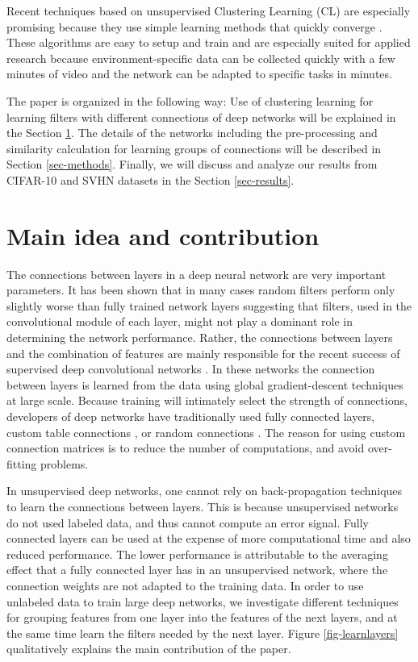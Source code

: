 \documentclass{article} %
\begin{document}
Recent techniques based on unsupervised Clustering Learning (CL) are especially promising because they use 
simple learning methods that quickly converge \cite{culurciello2013clustering,coates_analysis_2011}.
These algorithms are easy to setup and train and are especially suited for applied research because environment-specific data 
can be collected quickly with a few minutes of video and the network can be adapted to specific tasks in minutes.

The paper is organized in the following way: 
Use of clustering learning for learning filters with different connections of deep networks will be explained in the Section \ref{sec-main}. 
The details of the networks including the pre-processing and similarity calculation for learning groups of connections will be described in Section \ref{sec-methods}. 
Finally, we will discuss and analyze our results from CIFAR-10 and SVHN datasets in the Section \ref{sec-results}. 


\section{Main idea and contribution}
\label{sec-main}

The connections between layers in a deep neural network are very important parameters.
It has been shown that in many cases random filters perform only slightly worse than fully trained network layers \cite{saxe2011random} suggesting
that filters, used in the convolutional module of each layer, might not play a dominant role in determining the network performance.
Rather, the connections between layers and the combination of features are mainly responsible for the recent success of 
supervised deep convolutional networks \cite{krizhevsky_imagenet_2012}.
In these networks the connection between layers is
learned from the data using global gradient-descent techniques at large scale.
Because training will intimately select the strength of connections, 
developers of deep networks have traditionally used fully connected layers, custom table connections \cite{lecun_gradient-based_1998}, or 
random connections \cite{lecun_convolutional_2010}.
The reason for using custom connection matrices is to reduce the number of computations, and avoid over-fitting problems.
 
In unsupervised deep networks, one cannot rely on back-propagation techniques to learn the connections between layers. 
This is because unsupervised networks do not used labeled data, and thus cannot compute an error signal. 
Fully connected layers can be used \cite{culurciello2013clustering,coates_analysis_2011} at the expense of more computational time and also reduced performance.
The lower performance is attributable to the averaging effect that a fully connected layer has in an unsupervised network, 
where the connection weights are not adapted to the training data.
In order to use unlabeled data to train large deep networks, we investigate different techniques for grouping features from one layer into the features of the next layers, 
and at the same time learn the filters needed by the next layer.
Figure \ref{fig-learnlayers} qualitatively explains the main contribution of the paper.
\end{document}
